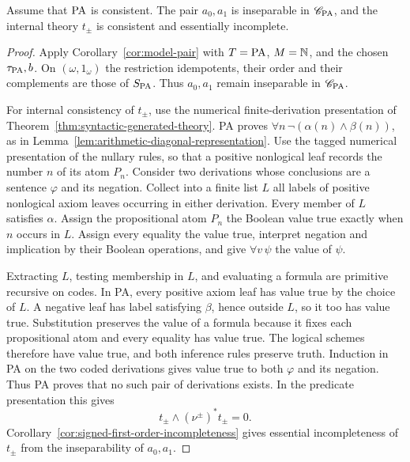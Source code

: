 \begin{lemma}
\label{lem:arithmetic-signed-theory}
Assume that $\mathrm{PA}$ is consistent. The pair $a_0,a_1$ is inseparable
in $\mathscr C_{\mathrm{PA}}$, and the internal theory $t_{\pm}$ is
consistent and essentially incomplete.
\end{lemma}
\begin{proof}
Apply Corollary~\ref{cor:model-pair} with $T=\mathrm{PA}$, $M=\mathbb N$, and the
chosen $\tau_{\mathrm{PA}},b$. On $(\omega,1_\omega)$ the restriction
idempotents, their order and their complements are those of $S_{\mathrm{PA}}$.
Thus $a_0,a_1$ remain inseparable in $\mathscr C_{\mathrm{PA}}$.

For internal consistency of $t_{\pm}$, use the numerical
finite-derivation presentation of
Theorem~\ref{thm:syntactic-generated-theory}. PA proves
$\forall n\,\neg(\alpha(n)\land\beta(n))$, as in
Lemma~\ref{lem:arithmetic-diagonal-representation}.
Use the tagged numerical presentation of the nullary rules, so that a
positive nonlogical leaf records the number $n$ of its atom $P_n$.
Consider two derivations whose conclusions are a sentence
$\varphi$ and its negation. Collect into a finite list $L$ all
labels of positive nonlogical axiom leaves occurring in either
derivation. Every member of $L$ satisfies $\alpha$.
Assign the propositional atom $P_n$ the Boolean value true exactly
when $n$ occurs in $L$. Assign every equality the value true,
interpret negation and implication by their Boolean operations,
and give $\forall v\,\psi$ the value of $\psi$.

Extracting $L$, testing membership in $L$, and evaluating a formula
are primitive recursive on codes. In PA, every positive axiom leaf
has value true by the choice of $L$. A negative leaf has label
satisfying $\beta$, hence outside $L$, so it too has value true.
Substitution preserves the value of a formula because it fixes each
propositional atom and every equality has value true. The logical schemes
therefore have value true, and both inference rules preserve truth.
Induction in PA on the two coded derivations gives value true to
both $\varphi$ and its negation. Thus PA proves that no such pair of
derivations exists. In the predicate presentation this gives
\[
 t_{\pm}\wedge(\nu^{\pm})^*t_{\pm}=0.
\]
Corollary~\ref{cor:signed-first-order-incompleteness} gives essential
incompleteness of $t_{\pm}$ from the inseparability of $a_0,a_1$.
\end{proof}

